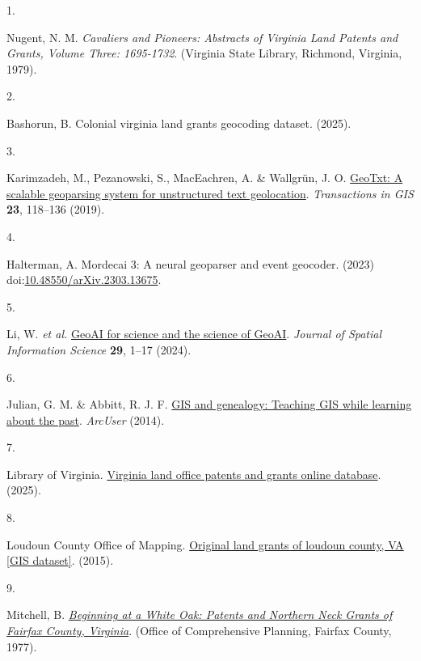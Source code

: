 \documentclass[
  10pt,
  twocolumn]{article}
\newlength{\cslhangindent}
\newlength{\csllabelwidth}
\newenvironment{CSLReferences}[2] %
 {\begin{list}{}{%
  \setlength{\itemindent}{0pt}
  \setlength{\leftmargin}{0pt}
  \setlength{\parsep}{0pt}
  \ifodd #1
   \setlength{\leftmargin}{\cslhangindent}
   \setlength{\itemindent}{-1\cslhangindent}
  \fi
  \setlength{\itemsep}{#2\baselineskip}}}
 {\end{list}}
\newcommand{\CSLLeftMargin}[1]{\parbox[t]{\csllabelwidth}{\strut#1\strut}}
\newcommand{\CSLRightInline}[1]{\parbox[t]{\linewidth - \csllabelwidth}{\strut#1\strut}}
\begin{document}
\protect{}\label{refs}
\begin{CSLReferences}{0}{0}
\CSLLeftMargin{1. }%
\CSLRightInline{Nugent, N. M. \emph{Cavaliers and Pioneers: Abstracts of
Virginia Land Patents and Grants, Volume Three: 1695-1732}. (Virginia
State Library, Richmond, Virginia, 1979).}

\CSLLeftMargin{2. }%
\CSLRightInline{Bashorun, B. Colonial virginia land grants geocoding
dataset. (2025).}

\CSLLeftMargin{3. }%
\CSLRightInline{Karimzadeh, M., Pezanowski, S., MacEachren, A. \&
Wallgrün, J. O. \href{https://doi.org/10.1111/tgis.12510}{GeoTxt: A
scalable geoparsing system for unstructured text geolocation}.
\emph{Transactions in GIS} \textbf{23}, 118--136 (2019).}

\CSLLeftMargin{4. }%
\CSLRightInline{Halterman, A. Mordecai 3: A neural geoparser and event
geocoder. (2023)
doi:\href{https://doi.org/10.48550/arXiv.2303.13675}{10.48550/arXiv.2303.13675}.}

\CSLLeftMargin{5. }%
\CSLRightInline{Li, W. \emph{et al.}
\href{https://doi.org/10.5311/JOSIS.2024.29.349}{GeoAI for science and
the science of GeoAI}. \emph{Journal of Spatial Information Science}
\textbf{29}, 1--17 (2024).}

\CSLLeftMargin{6. }%
\CSLRightInline{Julian, G. M. \& Abbitt, R. J. F.
\href{https://www.esri.com/about/newsroom/arcuser/gis-and-genealogy}{GIS
and genealogy: Teaching GIS while learning about the past}.
\emph{ArcUser} (2014).}

\CSLLeftMargin{7. }%
\CSLRightInline{Library of Virginia.
\href{https://lva-virginia.libguides.com/land-grants}{Virginia land
office patents and grants online database}. (2025).}

\CSLLeftMargin{8. }%
\CSLRightInline{Loudoun County Office of Mapping.
\href{https://www.arcgis.com/apps/MapTools/index.html?appid=d3c4ba1031564f919ca28c9bb5a48350}{Original
land grants of loudoun county, VA {[}GIS dataset{]}}. (2015).}

\CSLLeftMargin{9. }%
\CSLRightInline{Mitchell, B.
\emph{\href{https://www.fairfaxcounty.gov/history-commission/sites/history-commission/files/assets/documents/resources/map.pdf}{Beginning
at a White Oak: Patents and Northern Neck Grants of Fairfax County,
Virginia}}. (Office of Comprehensive Planning, Fairfax County, 1977).}


\end{CSLReferences}
\end{document}
